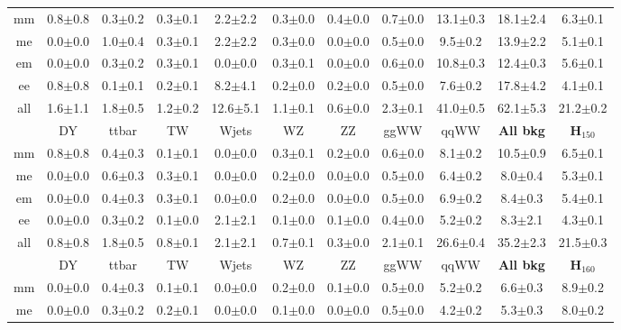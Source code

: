\begin{table}[!ht]
\begin{center}
{\begin{tabular} {|c|c|c|c|c|c|c|c|c||c||c|}
  \hline
  mm & 0.8$\pm$0.8 &  0.3$\pm$0.2 &  0.3$\pm$0.1 &  2.2$\pm$2.2 &  0.3$\pm$0.0 &  0.4$\pm$0.0 &  0.7$\pm$0.0 & 13.1$\pm$0.3 & 18.1$\pm$2.4 & 6.3$\pm$0.1 \\
  me & 0.0$\pm$0.0 &  1.0$\pm$0.4 &  0.3$\pm$0.1 &  2.2$\pm$2.2 &  0.3$\pm$0.0 &  0.0$\pm$0.0 &  0.5$\pm$0.0 &  9.5$\pm$0.2 & 13.9$\pm$2.2 & 5.1$\pm$0.1 \\
  em & 0.0$\pm$0.0 &  0.3$\pm$0.2 &  0.3$\pm$0.1 &  0.0$\pm$0.0 &  0.3$\pm$0.1 &  0.0$\pm$0.0 &  0.6$\pm$0.0 & 10.8$\pm$0.3 & 12.4$\pm$0.3 & 5.6$\pm$0.1 \\
  ee & 0.8$\pm$0.8 &  0.1$\pm$0.1 &  0.2$\pm$0.1 &  8.2$\pm$4.1 &  0.2$\pm$0.0 &  0.2$\pm$0.0 &  0.5$\pm$0.0 &  7.6$\pm$0.2 & 17.8$\pm$4.2 & 4.1$\pm$0.1 \\
 \hline
 all & 1.6$\pm$1.1 &  1.8$\pm$0.5 &  1.2$\pm$0.2 & 12.6$\pm$5.1 &  1.1$\pm$0.1 &  0.6$\pm$0.0 &  2.3$\pm$0.1 & 41.0$\pm$0.5 & 62.1$\pm$5.3 & 21.2$\pm$0.2 \\
  \hline
  \hline
  & DY & ttbar & TW & Wjets & WZ & ZZ & ggWW & qqWW & {\bf All bkg} & {\bf H$_{150}$}\\
  \hline
  mm & 0.8$\pm$0.8 &  0.4$\pm$0.3 &  0.1$\pm$0.1 &  0.0$\pm$0.0 &  0.3$\pm$0.1 &  0.2$\pm$0.0 &  0.6$\pm$0.0 &  8.1$\pm$0.2 & 10.5$\pm$0.9 & 6.5$\pm$0.1 \\
  me & 0.0$\pm$0.0 &  0.6$\pm$0.3 &  0.3$\pm$0.1 &  0.0$\pm$0.0 &  0.2$\pm$0.0 &  0.0$\pm$0.0 &  0.5$\pm$0.0 &  6.4$\pm$0.2 &  8.0$\pm$0.4 & 5.3$\pm$0.1 \\
  em & 0.0$\pm$0.0 &  0.4$\pm$0.3 &  0.3$\pm$0.1 &  0.0$\pm$0.0 &  0.2$\pm$0.0 &  0.0$\pm$0.0 &  0.5$\pm$0.0 &  6.9$\pm$0.2 &  8.4$\pm$0.3 & 5.4$\pm$0.1 \\
  ee & 0.0$\pm$0.0 &  0.3$\pm$0.2 &  0.1$\pm$0.0 &  2.1$\pm$2.1 &  0.1$\pm$0.0 &  0.1$\pm$0.0 &  0.4$\pm$0.0 &  5.2$\pm$0.2 &  8.3$\pm$2.1 & 4.3$\pm$0.1 \\
 \hline
 all & 0.8$\pm$0.8 &  1.8$\pm$0.5 &  0.8$\pm$0.1 &  2.1$\pm$2.1 &  0.7$\pm$0.1 &  0.3$\pm$0.0 &  2.1$\pm$0.1 & 26.6$\pm$0.4 & 35.2$\pm$2.3 & 21.5$\pm$0.3 \\
 \hline
 \hline
  & DY & ttbar & TW & Wjets & WZ & ZZ & ggWW & qqWW & {\bf All bkg} & {\bf H$_{160}$}\\
  \hline
  mm & 0.0$\pm$0.0 &  0.4$\pm$0.3 &  0.1$\pm$0.1 &  0.0$\pm$0.0 &  0.2$\pm$0.0 &  0.1$\pm$0.0 &  0.5$\pm$0.0 &  5.2$\pm$0.2 &  6.6$\pm$0.3 & 8.9$\pm$0.2 \\
  me & 0.0$\pm$0.0 &  0.3$\pm$0.2 &  0.2$\pm$0.1 &  0.0$\pm$0.0 &  0.1$\pm$0.0 &  0.0$\pm$0.0 &  0.5$\pm$0.0 &  4.2$\pm$0.2 &  5.3$\pm$0.3 & 8.0$\pm$0.2 \\

\end{tabular}}
\end{center}
\end{table}
